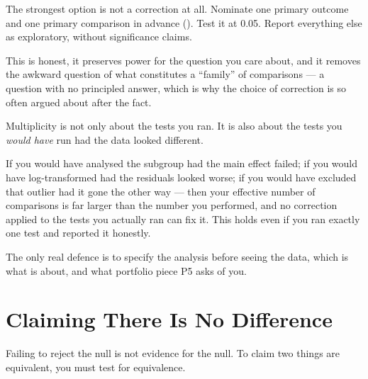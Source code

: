 \begin{conceptbox}
The strongest option is not a correction at all. Nominate one primary outcome
and one primary comparison in advance (). Test it at 0.05. Report
everything else as exploratory, without significance claims.

\medskip
This is honest, it preserves power for the question you care about, and it
removes the awkward question of what constitutes a ``family'' of comparisons
--- a question with no principled answer, which is why the choice of correction
is so often argued about after the fact.
\end{conceptbox}

\begin{alertbox}
Multiplicity is not only about the tests you ran. It is also about the tests
you \emph{would have} run had the data looked different.

\medskip
If you would have analysed the subgroup had the main effect failed; if you would
have log-transformed had the residuals looked worse; if you would have excluded
that outlier had it gone the other way --- then your effective number of
comparisons is far larger than the number you performed, and no correction
applied to the tests you actually ran can fix it. This holds even if you ran
exactly one test and reported it honestly.

\medskip
The only real defence is to specify the analysis before seeing the data, which
is what  is about, and what portfolio piece P5 asks of you.
\end{alertbox}

\section{Claiming There Is No Difference}

Failing to reject the null is not evidence for the null. To claim two things
are equivalent, you must test for equivalence.

